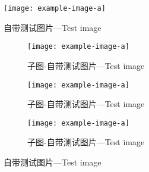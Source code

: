 \begin{figure}[htb]
    \centering
    \texttt{[image: example-image-a]}
    \caption{自带测试图片---Test image}\label{F:test-a}
\end{figure}

\begin{figure}[htb]
    \centering
    \begin{subfigure}[t]{.3\linewidth}
        \centering
        \texttt{[image: example-image-a]}
        \caption{子图-自带测试图片---Test image}\label{F:test-b-sub-a}
    \end{subfigure}
    \begin{subfigure}[t]{.3\linewidth}
        \centering
        \texttt{[image: example-image-a]}
        \caption{子图-自带测试图片---Test image}\label{F:test-b-sub-b}
    \end{subfigure}
    \begin{subfigure}[t]{.3\linewidth}
        \centering
        \texttt{[image: example-image-a]}
        \caption{子图-自带测试图片---Test image}\label{F:test-b-sub-b}
    \end{subfigure}
    \caption{自带测试图片---Test image}\label{F:test-b}
\end{figure}